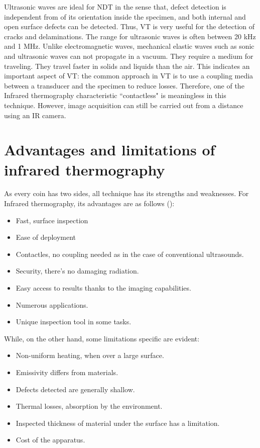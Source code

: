 Ultrasonic waves are ideal for NDT in the sense that, defect detection is independent from of its orientation inside the specimen, and both internal and open surface defects can be detected. Thus, VT is very useful for the detection of cracks and delaminations. The range for ultrasonic waves is often between 20 kHz and 1 MHz. Unlike electromagnetic waves, mechanical elastic waves such as sonic and ultrasonic waves can not propagate in a vacuum. They require a medium for traveling. They travel faster in solids and liquids than the air. This indicates an important aspect of VT: the common approach in VT is to use a coupling media between a transducer and the specimen to reduce losses. Therefore, one of the Infrared thermography characteristic ``contactless" is meaningless in this technique. However, image acquisition can still be carried out from a distance using an IR camera.

\section{Advantages and limitations of infrared thermography}
As every coin has two sides, all technique has its strengths and weaknesses. For Infrared thermography, its advantages are as follows (\citet{maldague3introduction, Maldague2001theory}):
\begin{itemize}
	\item Fast, surface inspection
	\item Ease of deployment
	\item Contactles, no coupling needed as in the case of conventional ultrasounds.
	\item Security, there's no damaging radiation.
	\item Easy access to results thanks to the imaging capabilities.
	\item Numerous applications.
	\item Unique inspection tool in some tasks.
\end{itemize}
While, on the other hand, some limitations specific are evident:%
\begin{itemize}
	\item Non-uniform heating, when over a large surface.
	\item Emissivity differs from materials.
	\item Defects detected are generally shallow.
	\item Thermal losses, absorption by the environment.
	\item Inspected thickness of material under the surface has a limitation.
	\item Cost of the apparatus.
\end{itemize}

